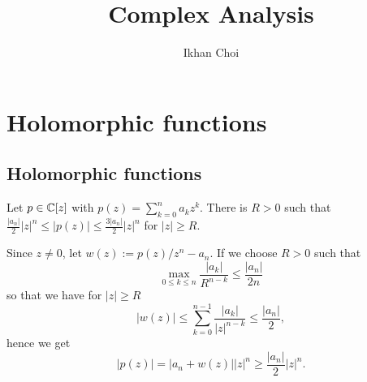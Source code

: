 \documentclass{../note}
\begin{document}
\title{Complex Analysis}
\author{Ikhan Choi}
\maketitle
\tableofcontents



\chapter{Holomorphic functions}

\section{Holomorphic functions}

\begin{prb}
Let $p\in\mathbb{C}[z]$ with $p(z)=\sum_{k=0}^na_kz^k$.
There is $R>0$ such that $\frac{|a_n|}2|z|^n\le|p(z)|\le\frac{3|a_n|}2|z|^n$ for $|z|\ge R$.
\end{prb}
\begin{pf}
Since $z\ne0$, let $w(z):=p(z)/z^n-a_n$.
If we choose $R>0$ such that
\[\max_{0\le k\le n}\frac{|a_k|}{R^{n-k}}\le\frac{|a_n|}{2n}\]
so that we have for $|z|\ge R$
\[|w(z)|\le\sum_{k=0}^{n-1}\frac{|a_k|}{|z|^{n-k}}\le\frac{|a_n|}2,\]
hence we get
\[|p(z)|=|a_n+w(z)||z|^n\ge\frac{|a_n|}2|z|^n.\]
\end{pf}
\end{document}

